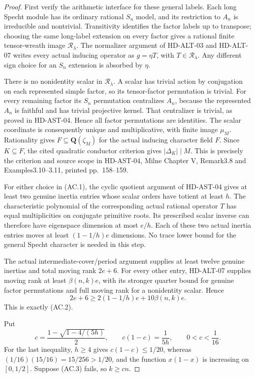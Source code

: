 \begin{proof}
First verify the arithmetic interface for these general labels.
Each long Specht module has its ordinary rational $S_n$ model, and
its restriction to $A_n$ is irreducible and nontrivial.
Transitivity identifies the factor labels up to transpose; choosing
the same long-label extension on every factor gives a rational finite
tensor-wreath image $\mathcal R_\lambda$. The normalizer argument of
HD-ALT-03 and HD-ALT-07 writes every actual inducing operator as
$g=\eta T$, with $T\in\mathcal R_\lambda$.
Any different sign choice for an $S_n$ extension is absorbed by $\eta$.

There is no nonidentity scalar in $\mathcal R_\lambda$.
A scalar has trivial action by conjugation on each represented
simple factor, so its tensor-factor permutation is trivial.
For every remaining factor its $S_n$ permutation centralizes $A_n$,
because the represented $A_n$ is faithful and has trivial projective
kernel. That centralizer is trivial, as proved in HD-AST-04.
Hence all factor permutations are identities. The scalar coordinate
is consequently unique and multiplicative, with finite image $\mu_M$.
Rationality gives $F\subseteq\mathbf Q(\zeta_M)$ for the actual
inducing character field $F$. Since $K\subseteq F$, the cited
quadratic conductor criterion gives $|\Delta_K|\mid M$.
This is precisely the criterion and source scope in HD-AST-04,
Milne Chapter V, Remark3.8 and Examples3.10--3.11,
printed pp.~158--159.\cite{HD:MilneCFT2020}

For either choice in (AC.1), the cyclic quotient argument of
HD-AST-04 gives at least two genuine inertia entries whose scalar
orders have totient at least $h$. The characteristic polynomial of
the corresponding actual rational operator $T$ has equal
multiplicities on conjugate primitive roots. Its prescribed scalar
inverse can therefore have eigenspace dimension at most $e/h$.
Each of these two actual inertia entries moves at least
$(1-1/h)e$ dimensions. No trace lower bound for the general Specht
character is needed in this step.

The actual intermediate-cover/period argument supplies at least twelve
genuine inertias and total moving rank $2e+6$. For every other entry,
HD-ALT-07 supplies moving rank at least $\beta(n,k)e$, with its
stronger quarter bound for genuine factor permutations and full
moving rank for a nonidentity scalar. Hence
\[
       2e+6\ge2(1-1/h)e+10\beta(n,k)e.
 \tag{AC.4}
\]
This is exactly (AC.2).

Put
\[
 c=\frac{1-\sqrt{1-4/(5h)}}2,
 \qquad c(1-c)=\frac1{5h},\qquad 0<c<\frac1{16}.
 \tag{AC.5}
\]
For the last inequality, $h\ge4$ gives $c(1-c)\le1/20$,
whereas $(1/16)(15/16)=15/256>1/20$, and the function
$x(1-x)$ is increasing on $[0,1/2]$.
Suppose (AC.3) fails, so $k\ge cn$.


\end{proof}

